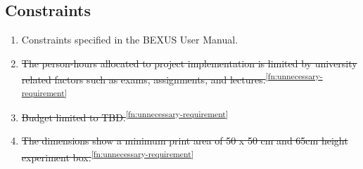 \subsection{Constraints}

\begin{enumerate}[label=C.\arabic*]
    \item Constraints specified in the BEXUS User Manual.
    \item \st{The person-hours allocated to project implementation is limited by university related factors such as exams, assignments, and lectures.}\textsuperscript{\ref{fn:unnecessary-requirement}}
    \item \st{Budget limited to TBD.}\textsuperscript{\ref{fn:unnecessary-requirement}}
    \item \st{The dimensions show a minimum print area of 50 x 50 cm and 65cm height experiment box.}\textsuperscript{\ref{fn:unnecessary-requirement}}
\end{enumerate}
